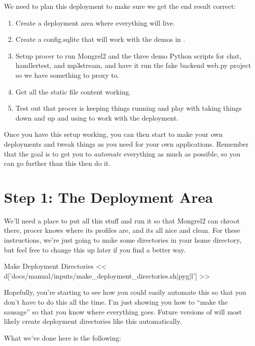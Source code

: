 We need to plan this deployment to make sure we get the end result correct:

\begin{enumerate}
\item Create a deployment area where everything will live.
\item Create a config.sqlite that will work with the demos in .
\item Setup procer to run Mongrel2 and the three demo Python scripts for chat, handlertest, and mp3stream,
    and have it run the fake backend web.py project so we have something to proxy to.
\item Get all the static file content working.
\item Test out that procer is keeping things running and play with taking things down and up and using
     to work with the deployment.
\end{enumerate}

Once you have this setup working, you can then start to make your own
deployments and tweak things as you need for your own applications.  Remember
that the goal is to get you to \emph{automate} everything as much as possible,
so you can go further than this then do it.

\section{Step 1: The Deployment Area}

We'll need a place to put all this stuff and run it so that Mongrel2 can chroot
there, procer knows where its profiles are, and its all nice and clean.  For these
instructions, we're just going to make some directories in your home directory,
but feel free to change this up later if you find a better way.

\begin{code}{Make Deployment Directories}
<< d['docs/manual/inputs/make_deployment_directories.sh|pyg|l'] >>
\end{code}

Hopefully, you're starting to see how you could easily automate this so that you don't
have to do this all the time.  I'm just showing you how to ``make the sausage'' so that
you know where everything goes.  Future versions of  will most likely
create deployment directories like this automatically.

What we've done here is the following:

